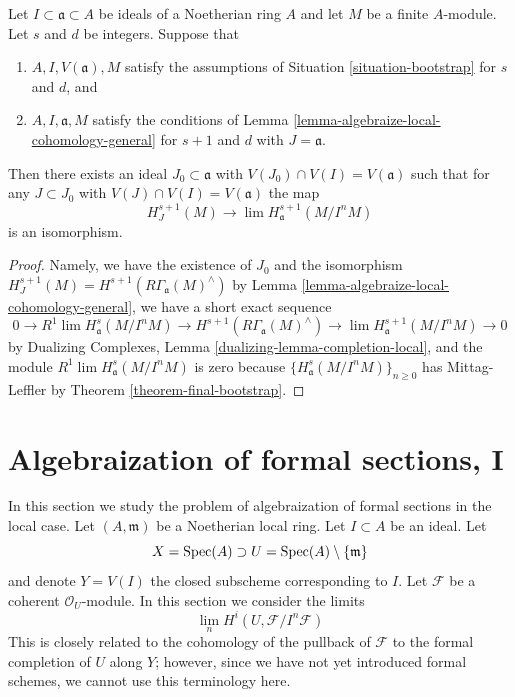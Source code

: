 \begin{lemma}
\label{lemma-combine-two}
Let $I \subset \mathfrak a \subset A$ be ideals of a Noetherian ring $A$
and let $M$ be a finite $A$-module. Let $s$ and $d$ be integers.
Suppose that
\begin{enumerate}
\item $A, I, V(\mathfrak a), M$ satisfy the assumptions of
Situation \ref{situation-bootstrap} for $s$ and $d$, and
\item $A, I, \mathfrak a, M$ satisfy the conditions of
Lemma \ref{lemma-algebraize-local-cohomology-general}
for $s + 1$ and $d$ with $J = \mathfrak a$.
\end{enumerate}
Then there exists an ideal
$J_0 \subset \mathfrak a$ with $V(J_0) \cap V(I) = V(\mathfrak a)$
such that for any $J \subset J_0$ with $V(J) \cap V(I) = V(\mathfrak a)$
the map
$$
H^{s + 1}_J(M) \longrightarrow \lim H^{s + 1}_\mathfrak a(M/I^nM)
$$
is an isomorphism.
\end{lemma}

\begin{proof}
Namely, we have the existence of $J_0$
and the isomorphism
$H^{s + 1}_J(M) = H^{s + 1}(R\Gamma_\mathfrak a(M)^\wedge)$
by Lemma \ref{lemma-algebraize-local-cohomology-general},
we have a short exact sequence
$$
0 \to R^1\lim H^s_\mathfrak a(M/I^nM) \to
H^{s + 1}(R\Gamma_\mathfrak a(M)^\wedge) \to
\lim H^{s + 1}_\mathfrak a(M/I^nM) \to 0
$$
by Dualizing Complexes, Lemma \ref{dualizing-lemma-completion-local},
and the module $R^1\lim H^s_\mathfrak a(M/I^nM)$ is zero because
$\{H^s_\mathfrak a(M/I^nM)\}_{n \geq 0}$ has Mittag-Leffler
by Theorem \ref{theorem-final-bootstrap}.
\end{proof}








\section{Algebraization of formal sections, I}
\label{section-algebraization-sections}

\noindent
In this section we study the problem of algebraization of
formal sections in the local case.
Let $(A, \mathfrak m)$ be a Noetherian local ring.
Let $I \subset A$ be an ideal. Let
$$
X = \mathop{\mathrm{Spec}}(A) \supset U = \mathop{\mathrm{Spec}}(A) \setminus \{\mathfrak m\}
$$
and denote $Y = V(I)$ the closed subscheme corresponding to $I$.
Let $\mathcal{F}$ be a coherent $\mathcal{O}_U$-module.
In this section we consider the limits
$$
\lim_n H^i(U, \mathcal{F}/I^n\mathcal{F})
$$
This is closely related to the cohomology of the pullback
of $\mathcal{F}$ to the formal completion of $U$ along $Y$;
however, since we have not yet introduced formal schemes,
we cannot use this terminology here.


